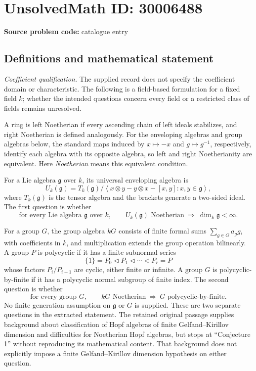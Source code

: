 \documentclass[11pt]{article}
\begin{document}
\section*{UnsolvedMath ID: 30006488}
\textbf{Source problem code:} catalogue entry
\subsection{Definitions and mathematical statement}
\emph{Coefficient qualification.} The supplied record does not specify the coefficient domain or characteristic. The following is a field-based formulation for a fixed field \(k\); whether the intended questions concern every field or a restricted class of fields remains unresolved.

A ring is left Noetherian if every ascending chain of left ideals stabilizes, and right Noetherian is defined analogously. For the enveloping algebras and group algebras below, the standard maps induced by \(x\mapsto -x\) and \(g\mapsto g^{-1}\), respectively, identify each algebra with its opposite algebra, so left and right Noetherianity are equivalent. Here \emph{Noetherian} means this equivalent condition.

For a Lie algebra \(\mathfrak g\) over \(k\), its universal enveloping algebra is
\[
U_k(\mathfrak g)=T_k(\mathfrak g)\big/\left\langle x\otimes y-y\otimes x-[x,y]:x,y\in\mathfrak g\right\rangle,
\]
where \(T_k(\mathfrak g)\) is the tensor algebra and the brackets generate a two-sided ideal. The first question is whether
\[
\text{for every Lie algebra }\mathfrak g\text{ over }k,\qquad
U_k(\mathfrak g)\text{ Noetherian}\ \Longrightarrow\ \dim_k\mathfrak g<\infty.
\]

For a group \(G\), the group algebra \(kG\) consists of finite formal sums \(\sum_{g\in G}a_g g\), with coefficients in \(k\), and multiplication extends the group operation bilinearly. A group \(P\) is polycyclic if it has a finite subnormal series
\[
\{1\}=P_0\triangleleft P_1\triangleleft\cdots\triangleleft P_r=P
\]
whose factors \(P_i/P_{i-1}\) are cyclic, either finite or infinite. A group \(G\) is polycyclic-by-finite if it has a polycyclic normal subgroup of finite index. The second question is whether
\[
\text{for every group }G,\qquad
kG\text{ Noetherian}\ \Longrightarrow\ G\text{ polycyclic-by-finite}.
\]
No finite generation assumption on \(\mathfrak g\) or \(G\) is supplied. These are two separate questions in the extracted statement. The retained original passage supplies background about classification of Hopf algebras of finite Gelfand--Kirillov dimension and difficulties for Noetherian Hopf algebras, but stops at ``Conjecture 1'' without reproducing its mathematical content. That background does not explicitly impose a finite Gelfand--Kirillov dimension hypothesis on either question.
\end{document}
